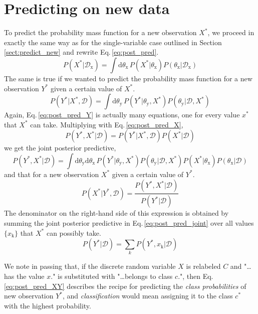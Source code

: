 \documentclass[]{report}
\begin{document}
\section{Predicting on new data}
To predict the probability mass function for a new observation $X^*$, we proceed in exactly the same way as for the single-variable case outlined in Section\,\ref{sect:predict_new} and rewrite Eq.\,\ref{eq:post_pred}.
\begin{equation} \label{eq:post_pred_X}
P( X^* | \mathcal{D}_\mathrm{x} )
= 
\int \mathrm{d}\theta_\mathrm{x} \,
	P( X^* | \theta_\mathrm{x} )
	P( \theta_\mathrm{x} | \mathcal{D}_\mathrm{x} )
\end{equation}
The same is true if we wanted to predict the probability mass function for a new observation $Y^*$ given a certain value of $X^*$.
\begin{equation} \label{eq:post_pred_Y}
P(Y^*|X^*, \mathcal{D}) = \int\mathrm{d}\theta_\mathrm{y}\,P(Y^*|\theta_\mathrm{y}, X^*)P(\theta_\mathrm{y}|\mathcal{D}, X^*)
\end{equation}
Again, Eq.\,\ref{eq:post_pred_Y} is actually many equations, one for every value $x^*$ that $X^*$ can take. Multiplying with Eq.\,\ref{eq:post_pred_X},
\begin{equation}
P(Y^*, X^*|\mathcal{D}) = P(Y^*|X^*, \mathcal{D})P(X^*|\mathcal{D})
\end{equation}
we get the joint posterior predictive,
\begin{equation} \label{eq:post_pred_joint}
P(Y^*, X^*|\mathcal{D}) = \int\mathrm{d}\theta_\mathrm{y}\mathrm{d}\theta_\mathrm{x}\,P(Y^*|\theta_\mathrm{y}, X^*)P(\theta_\mathrm{y}|\mathcal{D}, X^*)P(X^*|\theta_\mathrm{x})P(\theta_\mathrm{x}|\mathcal{D})
\end{equation}
and that for a new observation $X^*$ given a certain value of $Y^*$.
\begin{equation} \label{eq:post_pred_XY}
P(X^*|Y^*, \mathcal{D}) = \frac{P(Y^*, X^*|\mathcal{D})}{P(Y^*|\mathcal{D})}
\end{equation}
The denominator on the right-hand side of this expression is obtained by summing the joint posterior predictive in Eq.\,\ref{eq:post_pred_joint} over all values $\{x_\mathrm{k}\}$ that $X^*$ can possibly take.
\begin{equation}
P(Y^*|\mathcal{D}) = \sum_{k}P(Y^*, x_\mathrm{k}|\mathcal{D})
\end{equation}

We note in passing that, if the discrete random variable $X$ is relabeled $C$ and "\ldots has the value $x$." is substituted with "\ldots belongs to class $c$.", then Eq.\,\ref{eq:post_pred_XY} describes the recipe for predicting the \emph{class probabilities} of new observation $Y^*$, and \emph{classification} would mean assigning it to the class $c^*$ with the highest probability.
\end{document}
